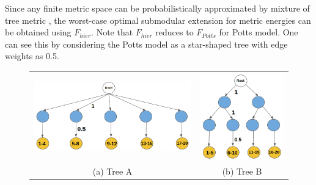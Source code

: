 Since any finite metric space can be probabilistically approximated by mixture
of tree metric \citep{bartal1996probabilistic}, the worst-case optimal
submodular extension for metric energies can be obtained using $F_{hier}$. Note
that $F_{hier}$ reduces to $F_{Potts}$ for Potts model. One can see this by
considering the Potts model as a star-shaped tree with edge weights as 0.5.
\begin{figure}
\centering
\begin{tabular}{cc}
\includegraphics[scale = 0.16]{./figures/synthetic_tree.png} &
\includegraphics[scale = 0.16]{./figures/synthetic_tree_2_new.png} \\
  \scriptsize(a) Tree A & \scriptsize(b) Tree B \\
\end{tabular}
\label{fig:syn_rhst}
\end{figure}

